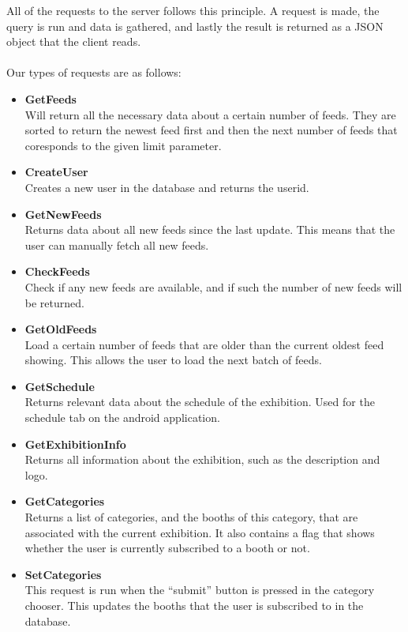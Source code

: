 All of the requests to the server follows this principle. A request is made, the query is run and data is gathered, and lastly the result is returned as a JSON object that the client reads.\\\\
Our types of requests are as follows:
\begin{itemize}
\item \textbf{GetFeeds}\\
 Will return all the necessary data about a certain number of feeds. They are sorted to return the newest feed first and then the next number of feeds that coresponds to the given limit parameter.
\item \textbf{CreateUser}\\
  Creates a new user in the database and returns the userid.
\item \textbf{GetNewFeeds}\\
  Returns data about all new feeds since the last update. This means that the user can manually fetch all new feeds.
\item \textbf{CheckFeeds}\\
  Check if any new feeds are available, and if such the number of new feeds will be returned.
\item \textbf{GetOldFeeds}\\
  Load a certain number of feeds that are older than the current oldest feed showing. This allows the user to load the next batch of feeds.
\item \textbf{GetSchedule}\\
  Returns relevant data about the schedule of the exhibition. Used for the schedule tab on the android application.
\item \textbf{GetExhibitionInfo}\\
  Returns all information about the exhibition, such as the description and logo.
\item \textbf{GetCategories}\\
  Returns a list of categories, and the booths of this category, that are associated with the current exhibition. It also contains a flag that shows whether the user is currently subscribed to a booth or not.
\item \textbf{SetCategories}\\
  This request is run when the ``submit'' button is pressed in the category chooser. This updates the booths that the user is subscribed to in the database.
\end{itemize}

